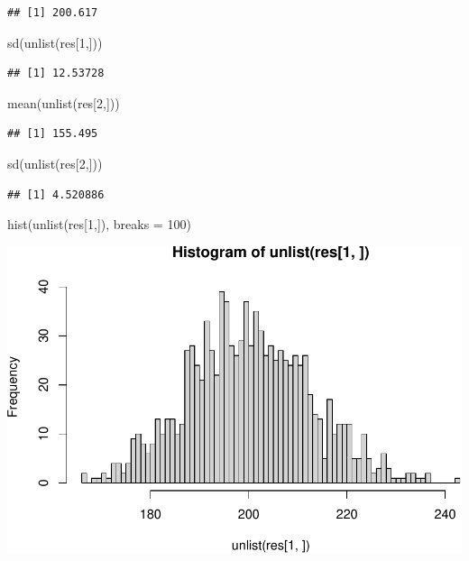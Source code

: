 \documentclass[
]{article}
\newenvironment{Shaded}{\begin{snugshade}}{\end{snugshade}}
\newcommand{\AttributeTok}[1]{\textcolor[rgb]{0.77,0.63,0.00}{#1}}
\newcommand{\DecValTok}[1]{\textcolor[rgb]{0.00,0.00,0.81}{#1}}
\newcommand{\FunctionTok}[1]{\textcolor[rgb]{0.00,0.00,0.00}{#1}}
\newcommand{\NormalTok}[1]{#1}
\begin{document}
\begin{verbatim}
## [1] 200.617
\end{verbatim}

\begin{Shaded}
\begin{Highlighting}[]
\FunctionTok{sd}\NormalTok{(}\FunctionTok{unlist}\NormalTok{(res[}\DecValTok{1}\NormalTok{,]))}
\end{Highlighting}
\end{Shaded}

\begin{verbatim}
## [1] 12.53728
\end{verbatim}

\begin{Shaded}
\begin{Highlighting}[]
\FunctionTok{mean}\NormalTok{(}\FunctionTok{unlist}\NormalTok{(res[}\DecValTok{2}\NormalTok{,]))}
\end{Highlighting}
\end{Shaded}

\begin{verbatim}
## [1] 155.495
\end{verbatim}

\begin{Shaded}
\begin{Highlighting}[]
\FunctionTok{sd}\NormalTok{(}\FunctionTok{unlist}\NormalTok{(res[}\DecValTok{2}\NormalTok{,]))}
\end{Highlighting}
\end{Shaded}

\begin{verbatim}
## [1] 4.520886
\end{verbatim}

\begin{Shaded}
\begin{Highlighting}[]
\FunctionTok{hist}\NormalTok{(}\FunctionTok{unlist}\NormalTok{(res[}\DecValTok{1}\NormalTok{,]), }\AttributeTok{breaks =} \DecValTok{100}\NormalTok{)}
\end{Highlighting}
\end{Shaded}

\includegraphics{examples_files/figure-latex/unnamed-chunk-7-1.pdf}
\end{document}

